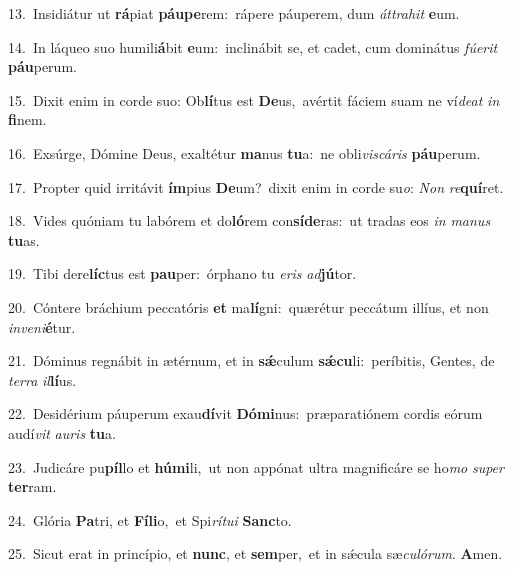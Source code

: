 {\numbfont\textcolor{\numbcolor}{13.}}~Insidiátur ut \textbf{rá}\-piat \textbf{páu}\-\textbf{pe}rem:~\star rápere páuperem, dum \textit{át}\-\textit{tra}\textit{hit} \textbf{e}\-um.\par
{\numbfont\textcolor{\numbcolor}{14.}}~In láqueo suo humili\-\textbf{á}\-bit \textbf{e}\-um:~\star inclinábit se, et cadet, cum dominátus \textit{fú}\-\textit{e}\textit{rit} \textbf{páu}\-perum.\par
{\numbfont\textcolor{\numbcolor}{15.}}~Dixit enim in corde suo: Ob\-\textbf{lí}\-tus est \textbf{De}\-us,~\star avértit fáciem suam ne ví\-\textit{de}\-\textit{at} \textit{in} \textbf{fi}\-nem.\par
{\numbfont\textcolor{\numbcolor}{16.}}~Exsúrge, Dómine Deus, exaltétur \textbf{ma}\-nus \textbf{tu}\-a:~\star ne obli\-\textit{vis}\-\textit{cá}\textit{ris} \textbf{páu}\-perum.\par
{\numbfont\textcolor{\numbcolor}{17.}}~Propter quid irritávit \textbf{ím}\-pius \textbf{De}\-um?~\star dixit enim in corde su\-\textit{o}\-: \textit{Non} \textit{re}\-\textbf{quí}ret.\par
{\numbfont\textcolor{\numbcolor}{18.}}~Vides quóniam tu labórem et do\-\textbf{ló}\-rem con\-\textbf{sí}\-\textbf{de}ras:~\star ut tradas eos \textit{in} \textit{ma}\-\textit{nus} \textbf{tu}\-as.\par
{\numbfont\textcolor{\numbcolor}{19.}}~Tibi dere\-\textbf{líc}\-tus est \textbf{pau}\-per:~\star órphano tu \textit{e}\-\textit{ris} \textit{ad}\-\textbf{jú}tor.\par
{\numbfont\textcolor{\numbcolor}{20.}}~Cóntere bráchium peccatóris \textbf{et} ma\-\textbf{lí}\-gni:~\star quærétur peccátum illíus, et non \textit{in}\-\textit{ve}\textit{ni}\textbf{é}tur.\par
{\numbfont\textcolor{\numbcolor}{21.}}~Dóminus regnábit in ætérnum, et in \textbf{sǽ}\-culum \textbf{sǽ}\-\textbf{cu}li:~\star períbitis, Gentes, de \textit{ter}\-\textit{ra} \textit{il}\-\textbf{lí}us.\par
{\numbfont\textcolor{\numbcolor}{22.}}~Desidérium páuperum exau\-\textbf{dí}\-vit \textbf{Dó}\-\textbf{mi}nus:~\star præparatiónem cordis eórum audí\textit{vit} \textit{au}\-\textit{ris} \textbf{tu}\-a.\par
{\numbfont\textcolor{\numbcolor}{23.}}~Judicáre pu\-\textbf{píl}\-lo et \textbf{hú}\-\textbf{mi}li,~\star ut non appónat ultra magnificáre se ho\textit{mo} \textit{su}\-\textit{per} \textbf{ter}\-ram.\par
{\numbfont\textcolor{\numbcolor}{24.}}~Glória \textbf{Pa}\-tri, et \textbf{Fí}\-\textbf{li}o,~\star et Spi\-\textit{rí}\-\textit{tu}\textit{i} \textbf{Sanc}\-to.\par
{\numbfont\textcolor{\numbcolor}{25.}}~Sicut erat in princípio, et \textbf{nunc}\-, et \textbf{sem}\-per,~\star et in sǽcula sæ\-\textit{cu}\-\textit{ló}\textit{rum}. \textbf{A}\-men.\par
